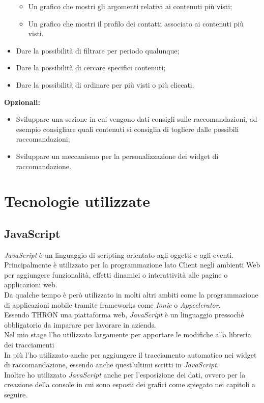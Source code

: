 \documentclass[a4paper, 12pt, twoside, openright]{book}
\begin{document}
\begin{itemize}
\begin{itemize}
		\item Un grafico che mostri gli argomenti relativi ai contenuti più visti;
		\item Un grafico che mostri il profilo dei contatti associato ai contenuti più visti.
		
	\end{itemize}

	\item Dare la possibilità di filtrare per periodo qualunque;
	\item Dare la possibilità di cercare specifici contenuti;
	\item Dare la possibilità di ordinare per più visti o più cliccati.
\end{itemize}
\textbf{Opzionali:}
\begin{itemize}
	\item Sviluppare una sezione in cui vengono dati consigli sulle raccomandazioni, ad esempio consigliare quali contenuti si consiglia di togliere dalle possibili raccomandazioni;
	\item Sviluppare un meccanismo per la personalizzazione dei widget di raccomandazione.
\end{itemize}

\newpage{}
\section{Tecnologie utilizzate}

\subsection{JavaScript}
\textit{JavaScript} è un linguaggio di scripting orientato agli oggetti e agli eventi. Principalmente è utilizzato per la programmazione lato Client negli ambienti Web per aggiungere funzionalità, effetti dinamici o interattività alle pagine o applicazioni web.\\
Da qualche tempo è però utilizzato in molti altri ambiti come la programmazione di applicazioni mobile tramite frameworks come \textit{Ionic} o \textit{Appcelerator}.\\

Essendo THRON una piattaforma web, \textit{JavaScript} è un linguaggio pressoché obbligatorio da imparare per lavorare in azienda.\\
Nel mio stage l'ho utilizzato largamente per apportare le modifiche alla libreria dei tracciamenti\\ 
In più l'ho utilizzato anche per aggiungere il tracciamento automatico nei widget di raccomandazione, essendo anche quest'ultimi scritti in \textit{JavaScript}.\\
Inoltre ho utilizzato \textit{JavaScript} anche per l'esposizione dei dati, ovvero per la creazione della console in cui sono esposti dei grafici come spiegato nei capitoli a seguire.\\ \\
\end{document}
